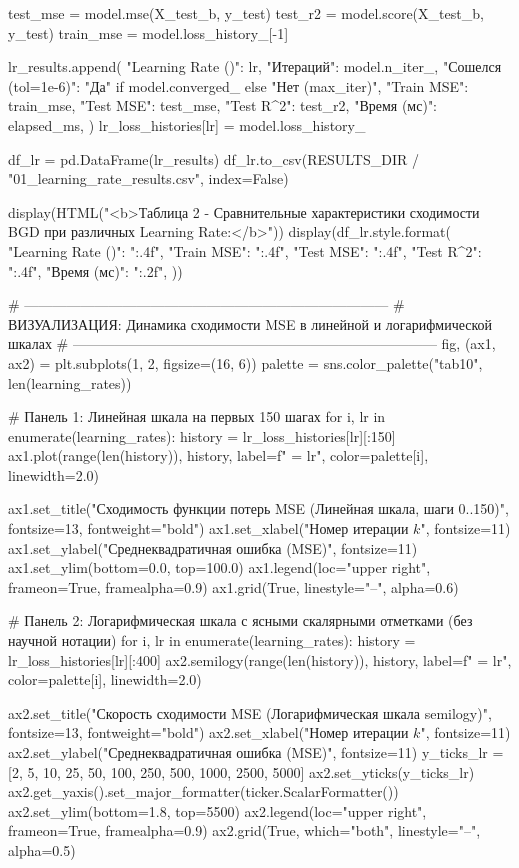 \documentclass[14pt,a4paper]{extarticle}
\begin{document}
\begin{CodeListing}
    test_mse = model.mse(X_test_b, y_test)
    test_r2 = model.score(X_test_b, y_test)
    train_mse = model.loss_history_[-1]

    lr_results.append({
        "Learning Rate ()": lr,
        "Итераций": model.n_iter_,
        "Сошелся (tol=1e-6)": "Да" if model.converged_ else "Нет (max_iter)",
        "Train MSE": train_mse,
        "Test MSE": test_mse,
        "Test R^2": test_r2,
        "Время (мс)": elapsed_ms,
    })
    lr_loss_histories[lr] = model.loss_history_

df_lr = pd.DataFrame(lr_results)
df_lr.to_csv(RESULTS_DIR / "01_learning_rate_results.csv", index=False)

display(HTML("<b>Таблица 2 - Сравнительные характеристики сходимости BGD при различных Learning Rate:</b>"))
display(df_lr.style.format({
    "Learning Rate ()": "{:.4f}",
    "Train MSE": "{:.4f}",
    "Test MSE": "{:.4f}",
    "Test R^2": "{:.4f}",
    "Время (мс)": "{:.2f}",
}))

# ------------------------------------------------------------------------------
# ВИЗУАЛИЗАЦИЯ: Динамика сходимости MSE в линейной и логарифмической шкалах
# ------------------------------------------------------------------------------
fig, (ax1, ax2) = plt.subplots(1, 2, figsize=(16, 6))
palette = sns.color_palette("tab10", len(learning_rates))

# Панель 1: Линейная шкала на первых 150 шагах
for i, lr in enumerate(learning_rates):
    history = lr_loss_histories[lr][:150]
    ax1.plot(range(len(history)), history, label=f" = {lr}", color=palette[i], linewidth=2.0)

ax1.set_title("Сходимость функции потерь MSE (Линейная шкала, шаги 0..150)", fontsize=13, fontweight="bold")
ax1.set_xlabel("Номер итерации $k$", fontsize=11)
ax1.set_ylabel("Среднеквадратичная ошибка (MSE)", fontsize=11)
ax1.set_ylim(bottom=0.0, top=100.0)
ax1.legend(loc="upper right", frameon=True, framealpha=0.9)
ax1.grid(True, linestyle="--", alpha=0.6)

# Панель 2: Логарифмическая шкала с ясными скалярными отметками (без научной нотации)
for i, lr in enumerate(learning_rates):
    history = lr_loss_histories[lr][:400]
    ax2.semilogy(range(len(history)), history, label=f" = {lr}", color=palette[i], linewidth=2.0)

ax2.set_title("Скорость сходимости MSE (Логарифмическая шкала semilogy)", fontsize=13, fontweight="bold")
ax2.set_xlabel("Номер итерации $k$", fontsize=11)
ax2.set_ylabel("Среднеквадратичная ошибка (MSE)", fontsize=11)
y_ticks_lr = [2, 5, 10, 25, 50, 100, 250, 500, 1000, 2500, 5000]
ax2.set_yticks(y_ticks_lr)
ax2.get_yaxis().set_major_formatter(ticker.ScalarFormatter())
ax2.set_ylim(bottom=1.8, top=5500)
ax2.legend(loc="upper right", frameon=True, framealpha=0.9)
ax2.grid(True, which="both", linestyle="--", alpha=0.5)


\end{CodeListing}
\end{document}
